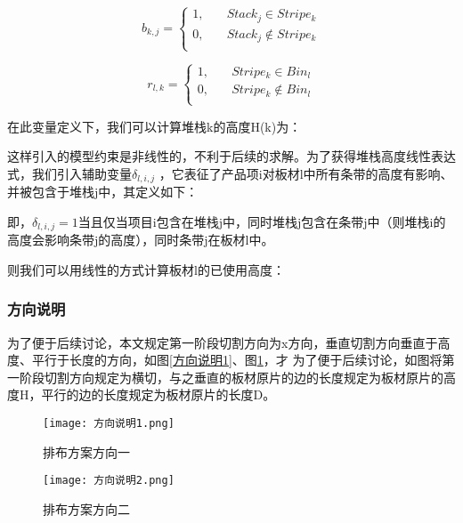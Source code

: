 \documentclass[bwprint]{gmcmthesis}
\begin{document}
\begin{equation}
    b_{k,j}=
    \begin{cases}
        1, \quad  & Stack_j \in  Stripe_k \\
        0,\quad  & Stack_j  \notin  Stripe_k \\
    \end{cases}
\end{equation}

\begin{equation}
    r_{l,k}=
    \begin{cases}
        1, \quad  & Stripe_k \in  Bin_l \\
        0,\quad  & Stripe_k  \notin  Bin_l \\
    \end{cases}
\end{equation}

在此变量定义下，我们可以计算堆栈k的高度H(k)为：

这样引入的模型约束是非线性的，不利于后续的求解。为了获得堆栈高度线性表达式，我们引入辅助变量$\delta_{l,i,j}$ ，它表征了产品项i对板材l中所有条带的高度有影响、并被包含于堆栈j中，其定义如下：


即，$\delta_{l,i,j} = 1$当且仅当项目i包含在堆栈j中，同时堆栈j包含在条带j中（则堆栈i的高度会影响条带j的高度），同时条带j在板材l中。

则我们可以用线性的方式计算板材l的已使用高度：

\subsubsection{方向说明}
为了便于后续讨论，本文规定第一阶段切割方向为x方向，垂直切割方向垂直于高度、平行于长度的方向，如图\ref{方向说明1}、图\ref{方向说明2}，才
为了便于后续讨论，如图将第一阶段切割方向规定为横切，与之垂直的板材原片的边的长度规定为板材原片的高度H，平行的边的长度规定为板材原片的长度D。
\begin{figure}[!htbp]
    \centering
    \begin{minipage}{0.48\linewidth}
        \centering
        \texttt{[image: 方向说明1.png]}
        \caption{排布方案方向一}\label{方向说明1}
    \end{minipage}
    \begin{minipage}{0.48\linewidth}
        \centering
        \texttt{[image: 方向说明2.png]}
        \caption{排布方案方向二}\label{方向说明2}
    \end{minipage}
\end{figure}
\end{document}
